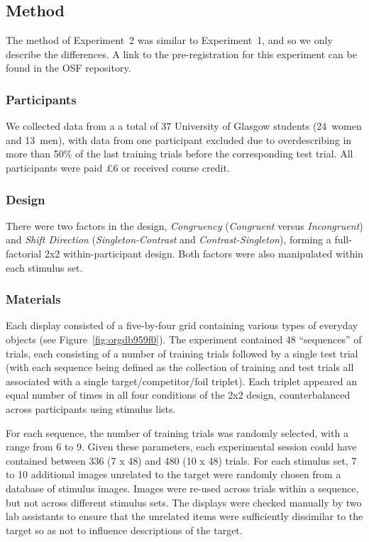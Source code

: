 \documentclass[natbib,man,a4paper]{apa6}
\begin{document}
\subsection*{Method}
\label{sec:org61a9d89}

The method of Experiment~2 was similar to Experiment~1, and so we only describe the differences. A link to the pre-registration for this experiment can be found in the OSF repository.

\subsubsection*{Participants}
\label{sec:org5ab19a2}

We collected data from a a total of 37 University of Glasgow students (24~women and 13~men), with data from one participant excluded due to overdescribing in more than 50\% of the last training trials before the corresponding test trial. All participants were paid £6 or received course credit.

\subsubsection*{Design}
\label{sec:orgf6392d2}

There were two factors in the design, \emph{Congruency} (\emph{Congruent} versus \emph{Incongruent}) and \emph{Shift Direction} (\emph{Singleton-Contrast} and \emph{Contrast-Singleton}), forming a full-factorial 2x2 within-participant design.  Both factors were also manipulated within each stimulus set.

\subsubsection*{Materials}
\label{sec:orgc048e9d}

Each display consisted of a five-by-four grid containing various types of everyday objects (see Figure~\ref{fig:orgdb959f0}). The experiment contained 48 ``sequences'' of trials, each consisting of a number of training trials followed by a single test trial (with each sequence being defined as the collection of training and test trials all associated with a single target/competitor/foil triplet). Each triplet appeared an equal number of times in all four conditions of the 2x2 design, counterbalanced across participants using stimulus lists.

For each sequence, the number of training trials was randomly selected, with a range from 6 to 9. Given these parameters, each experimental session could have contained between 336 (7 x 48) and 480 (10 x 48) trials. For each stimulus set, 7 to 10 additional images unrelated to the target were randomly chosen from a database of stimulus images. Images were re-used across trials within a sequence, but not across different stimulus sets. The displays were checked manually by two lab assistants to ensure that the unrelated items were sufficiently dissimilar to the target so as not to influence descriptions of the target.
\end{document}
